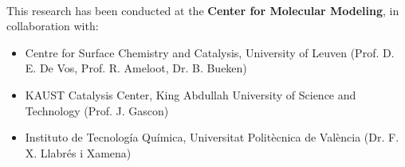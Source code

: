 \documentclass[10pt,twoside]{book}
\begin{document}


\newpage\null\thispagestyle{empty}\newpage
\thispagestyle{empty}
\noindent
\\
\vfill
{\small
\noindent \textsf{This research has been conducted at the \textbf{Center for
Molecular Modeling},} \noindent \textsf{in collaboration with:} \\
\begin{itemize}
\item
Centre for Surface Chemistry and Catalysis, University of Leuven (Prof. D. E. De
Vos, Prof. R. Ameloot, Dr. B. Bueken)
\item
KAUST Catalysis Center, King Abdullah University of Science and Technology
(Prof. J. Gascon)
\item 
Instituto de Tecnolog\'{i}a Qu\'{i}mica, Universitat Polit\`ecnica de Val\`encia
(Dr. F. X. Llabr\'es i Xamena)
\end{itemize}
 
}

\newpage %
\thispagestyle{empty}

\renewcommand{\baselinestretch}{1.2}

\frontmatter
{}



%


\newpage\null\thispagestyle{empty}\newpage
\thispagestyle{empty}





\tableofcontents

    \glsaddall
    



\listoffigures
\clearpage{\pagestyle{empty}\cleardoublepage}
\end{document}
